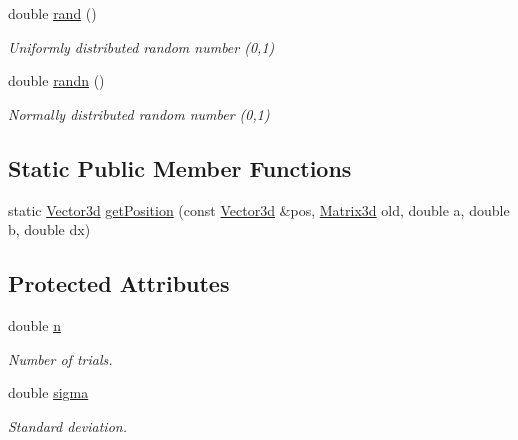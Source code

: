 \begin{DoxyCompactItemize}
\mbox{\label{classCPlantBox_1_1LeafTropismFunction_abedbb803bbcbaea767191a69072c0329}} 
double \hyperlink{classCPlantBox_1_1LeafTropismFunction_abedbb803bbcbaea767191a69072c0329}{rand} ()
\begin{DoxyCompactList}\small\item\em Uniformly distributed random number (0,1) \end{DoxyCompactList}\item 
\mbox{\label{classCPlantBox_1_1LeafTropismFunction_a841eba2b5f8e9766df7929181a10c5d8}} 
double \hyperlink{classCPlantBox_1_1LeafTropismFunction_a841eba2b5f8e9766df7929181a10c5d8}{randn} ()
\begin{DoxyCompactList}\small\item\em Normally distributed random number (0,1) \end{DoxyCompactList}\end{DoxyCompactItemize}
\subsection*{Static Public Member Functions}
\begin{DoxyCompactItemize}
\item 
static \hyperlink{classCPlantBox_1_1Vector3d}{Vector3d} \hyperlink{classCPlantBox_1_1LeafTropismFunction_a87441633ac10289ad861a08a7bf2c411}{get\+Position} (const \hyperlink{classCPlantBox_1_1Vector3d}{Vector3d} \&pos, \hyperlink{classCPlantBox_1_1Matrix3d}{Matrix3d} old, double a, double b, double dx)
\end{DoxyCompactItemize}
\subsection*{Protected Attributes}
\begin{DoxyCompactItemize}
\item 
\mbox{\label{classCPlantBox_1_1LeafTropismFunction_a21d8d756f8b9f6015b546def33b01c89}} 
double \hyperlink{classCPlantBox_1_1LeafTropismFunction_a21d8d756f8b9f6015b546def33b01c89}{n}
\begin{DoxyCompactList}\small\item\em Number of trials. \end{DoxyCompactList}\item 
\mbox{\label{classCPlantBox_1_1LeafTropismFunction_a82a3dc11056a65501bc4535749c304b6}} 
double \hyperlink{classCPlantBox_1_1LeafTropismFunction_a82a3dc11056a65501bc4535749c304b6}{sigma}
\begin{DoxyCompactList}\small\item\em Standard deviation. \end{DoxyCompactList}\end{DoxyCompactItemize}


